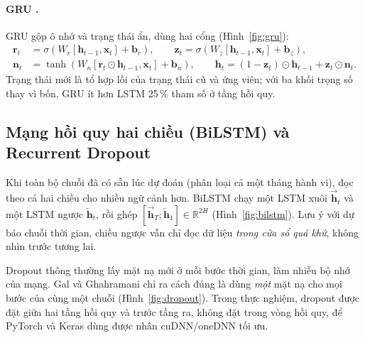 
\paragraph{GRU \cite{cho2014}.} GRU gộp ô nhớ và trạng thái ẩn, dùng hai cổng (Hình~\ref{fig:gru}):
\begin{align}
  \mathbf{r}_t &= \sigma(W_r[\mathbf{h}_{t-1}, \mathbf{x}_t] + \mathbf{b}_r), \qquad
  \mathbf{z}_t = \sigma(W_z[\mathbf{h}_{t-1}, \mathbf{x}_t] + \mathbf{b}_z), \\
  \mathbf{n}_t &= \tanh(W_n[\mathbf{r}_t \odot \mathbf{h}_{t-1}, \mathbf{x}_t] + \mathbf{b}_n), \qquad
  \mathbf{h}_t = (1 - \mathbf{z}_t) \odot \mathbf{h}_{t-1} + \mathbf{z}_t \odot \mathbf{n}_t .
\end{align}
Trạng thái mới là tổ hợp lồi của trạng thái cũ và ứng viên; với ba khối trọng số thay vì bốn, GRU ít hơn LSTM 25\,\% tham
số ở tầng hồi quy.


\subsection{Mạng hồi quy hai chiều (BiLSTM) và Recurrent Dropout}

Khi toàn bộ chuỗi đã có sẵn lúc dự đoán (phân loại cả một tháng hành vi), đọc theo cả hai chiều cho nhiều ngữ cảnh hơn.
BiLSTM \cite{schuster1997} chạy một LSTM xuôi $\overrightarrow{\mathbf{h}}_t$ và một LSTM ngược $\overleftarrow{\mathbf{h}}_t$,
rồi ghép $[\overrightarrow{\mathbf{h}}_T; \overleftarrow{\mathbf{h}}_1] \in \mathbb{R}^{2H}$ (Hình~\ref{fig:bilstm}). Lưu ý với
dự báo chuỗi thời gian, chiều ngược vẫn chỉ đọc dữ liệu \emph{trong cửa sổ quá khứ}, không nhìn trước tương lai.


Dropout thông thường lấy mặt nạ mới ở mỗi bước thời gian, làm nhiễu bộ nhớ của mạng. Gal và Ghahramani \cite{gal2016} chỉ
ra cách đúng là dùng \emph{một} mặt nạ cho mọi bước của cùng một chuỗi (Hình~\ref{fig:dropout}). Trong thực nghiệm, dropout
được đặt giữa hai tầng hồi quy và trước tầng ra, không đặt trong vòng hồi quy, để PyTorch và Keras dùng được nhân cuDNN/oneDNN
tối ưu.

